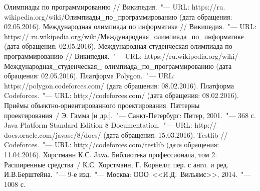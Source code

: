 \renewcommand{\bibname}{Список использованных источников}
\begin{thebibliography}{9}
 Олимпиады по программированию // Википедия.~"--- URL: https://ru. wikipedia.org/wiki/Олимпиады\_по\_программированию (дата обращения: 02.05.2016).
 Международная олимпиада по информатике // Википедия.~"--- URL: https:// ru.wikipedia.org/wiki/Международная\_олимпиада\_по\_информатике (дата обращения: 02.05.2016).
 Международная студенческая олимпиада по программированию // Википедия.~"--- URL: https://ru.wikipedia.org/wiki/Международная\_студенческая\_ олимпиада\_по\_про\-грам\-ми\-рованию (дата обращения: 02.05.2016).
 Платформа Polygon.~"--- URL: https://polygon.codeforces.com/ (дата обращения: 08.02.2016).
 Платформа Codeforces.~"--- URL: http://codeforces.com/ (дата обращения: 08.02.2016).
 Приёмы объектно-ориентированного проектирования. Паттерны проектирования~/ Э. Гамма [и др.].~"--- Санкт-Петербург: Питер, 2001.~"--- 368 с.
 Java Platform Standard Edition 8 Documentation.~"--- URL: http:// docs.oracle.com/javase/8/docs/ (дата обращения: 15.03.2016).
 Testlib // Codeforces.~"--- URL: http://codeforces.com/testlib (дата обращения: 11.04.2016).
 Хорстманн К.С. Java. Библиотека профессионала, том 2. Расширенные средства~/ К.С. Хорстманн, Г. Корнелл; пер. с англ. и ред. И.В.Берштейна.~"--- 9-е изд.~"--- Москва: ООО~<<И.Д.~Вильямс>>, 2014.~"--- 1008 с.
\end{thebibliography}